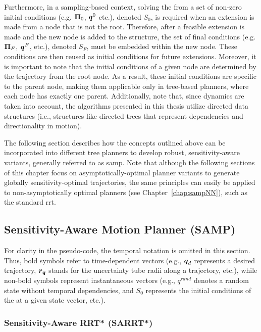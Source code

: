 Furthermore, in a sampling-based context, solving the  from a set of non-zero initial conditions (e.g. $\boldsymbol{\Pi}_0$, $\boldsymbol{q}^0$ etc.), denoted $S_0$, is required when an extension is made from a node that is not the root.
Therefore, after a feasible extension is made and the new node is added to the structure, the set of final conditions (e.g. $\boldsymbol{\Pi}_F$, $\boldsymbol{q}^F$,  etc.), denoted $S_F$, must be embedded within the new node.
These conditions are then reused as initial conditions for future extensions.
Moreover, it is important to note that the initial conditions of a given node are determined by the trajectory from the root node. 
As a result, these initial conditions are specific to the parent node, making them applicable only in tree-based planners, where each node has exactly one parent.
Additionally, note that, since dynamics are taken into account, the algorithms presented in this thesis utilize directed data structures (i.e., structures like directed trees that represent dependencies and directionality in motion).

The following section describes how the concepts outlined above can be incorporated into different tree planners to develop robust, sensitivity-aware variants, generally referred to as \gls{samp}.
Note that although the following sections of this chapter focus on asymptotically-optimal planner variants to generate globally sensitivity-optimal trajectories, the same principles can easily be applied to non-asymptotically optimal planners (see Chapter~\ref{chap:sampNN}), such as the standard \gls{rrt}.
 
\subsection{Sensitivity-Aware Motion Planner (SAMP)}\label{sec:samp}

For clarity in the pseudo-code, the temporal notation is omitted in this section. 
Thus, bold symbols refer to time-dependent vectors (e.g., $\boldsymbol{q}_d$ represents a desired trajectory, $\boldsymbol{r_q}$ stands for the uncertainty tube radii along a trajectory, etc.), while non-bold symbols represent instantaneous vectors (e.g., $q^{rand}$ denotes a random state without temporal dependencies, and $S_0$ represents the initial conditions of the  at a given state vector, etc.).

\subsubsection{Sensitivity-Aware RRT* (SARRT*)}

